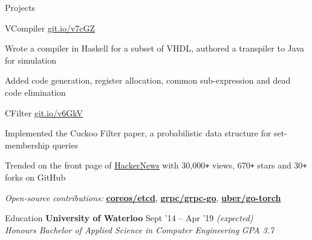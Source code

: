 \documentclass{resume} %
\begin{document}
\begin{rSection}{Projects}
  \begin{rSubsection}{VCompiler}
                     {\href{https://git.io/v7cGZ}{git.io/v7cGZ}}
                     {}{}
   \item Wrote a compiler in Haskell for a subset of VHDL, authored a
     transpiler to Java for simulation
   \item Added code generation, register allocation, common sub-expression and
     dead code elimination
  \end{rSubsection}

  \begin{rSubsection}{CFilter}
    {\href{https://git.io/v6GkV}{git.io/v6GkV}}
                     {}{}
     \item Implemented the Cuckoo Filter paper, a probabilistic data structure for
       set-membership queries
     \item Trended on the front page of
       \href{https://news.ycombinator.com/item?id=12241332}{\underline
       {HackerNews}} with 30,000\texttt{+} views, 670\texttt{+} stars and
       30\texttt{+} forks on GitHub
  \end{rSubsection}

  \begin{rMinisection}
    \item {\em Open-source contributions:}
      \href{https://github.com/coreos/etcd/pull/8288}{\textbf{coreos/etcd}},
      \href{https://github.com/grpc/grpc-go/pull/1478}{\textbf{grpc/grpc-go}},
      \href{https://github.com/uber/go-torch/pull/62}{\textbf{uber/go-torch}}
  \end{rMinisection}
\end{rSection}


\begin{rSection}{Education}
  {\bf University of Waterloo} \hfill {Sept '14 -- Apr '19 \em (expected)} \\
  {\em Honours Bachelor of Applied Science in Computer Engineering} \hfill {\em GPA 3.7}
  \vspace{0.5em}
\end{rSection}
\end{document}
